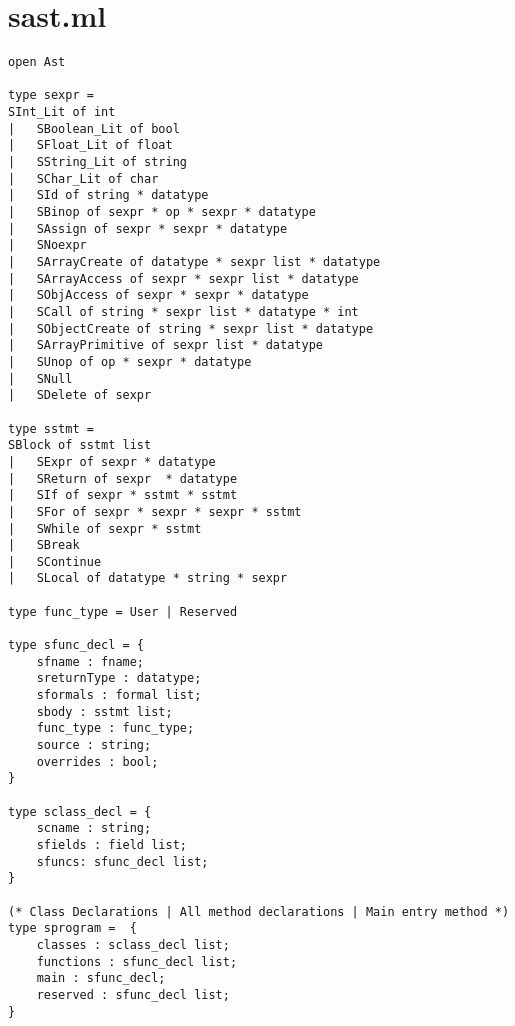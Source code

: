 \section{sast.ml}
\begin{verbatim}
open Ast

type sexpr =
SInt_Lit of int
| 	SBoolean_Lit of bool
| 	SFloat_Lit of float
| 	SString_Lit of string
| 	SChar_Lit of char
| 	SId of string * datatype
| 	SBinop of sexpr * op * sexpr * datatype
| 	SAssign of sexpr * sexpr * datatype
| 	SNoexpr
| 	SArrayCreate of datatype * sexpr list * datatype
| 	SArrayAccess of sexpr * sexpr list * datatype
| 	SObjAccess of sexpr * sexpr * datatype
| 	SCall of string * sexpr list * datatype * int
|   SObjectCreate of string * sexpr list * datatype
| 	SArrayPrimitive of sexpr list * datatype
|  	SUnop of op * sexpr * datatype
| 	SNull
| 	SDelete of sexpr

type sstmt =
SBlock of sstmt list
| 	SExpr of sexpr * datatype
| 	SReturn of sexpr  * datatype
| 	SIf of sexpr * sstmt * sstmt
| 	SFor of sexpr * sexpr * sexpr * sstmt
| 	SWhile of sexpr * sstmt
|  	SBreak
|   SContinue
|   SLocal of datatype * string * sexpr

type func_type = User | Reserved

type sfunc_decl = {
	sfname : fname;
	sreturnType : datatype;
	sformals : formal list;
	sbody : sstmt list;
	func_type : func_type;
	source : string;
	overrides : bool;
}

type sclass_decl = {
	scname : string;
	sfields : field list;
	sfuncs: sfunc_decl list;
}

(* Class Declarations | All method declarations | Main entry method *)
type sprogram =  {
	classes : sclass_decl list;
	functions : sfunc_decl list;
	main : sfunc_decl;
	reserved : sfunc_decl list;
}

\end{verbatim}	